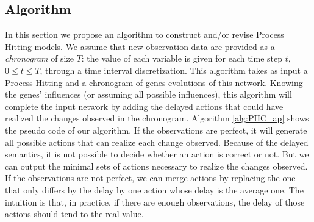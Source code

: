 \subsection{Algorithm}
In this section we propose an algorithm to construct and/or revise Process Hitting models.
We assume that new observation data are provided as a {\it chronogram} of size $T$:
the value of each variable is given for each time step $t$, $0 \leq t \leq T$, through a time interval discretization.   
This algorithm takes as input a Process Hitting and a chronogram of genes evolutions of this network.
Knowing the genes' influences (or assuming all possible influences),
this algorithm will complete the input network by adding the delayed actions that could have realized the changes observed in the chronogram.
Algorithm \ref{alg:PHC_ap} shows the pseudo code of our algorithm.
If the observations are perfect, it will generate all possible actions that can realize each change observed.
Because of the delayed semantics, it is not possible to decide whether an action is correct or not.
But we can output the minimal sets of actions necessary to realize the changes observed.
If the observations are not perfect, we can merge actions by replacing the one that only differs by the delay by one action whose delay is the average one.
The intuition is that, in practice, if there are enough observations, the delay of those actions should tend to the real value.

